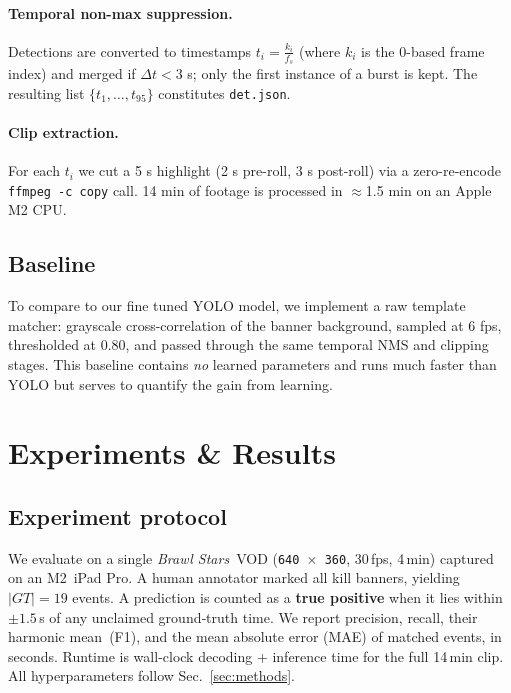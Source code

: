 \documentclass[10pt,twocolumn,letterpaper]{article}
\begin{document}
\paragraph{Temporal non-max suppression.}
Detections are converted to timestamps
\(t_i = \frac{k_i}{f_s}\) (where \(k_i\) is the 0-based frame index) and merged if
\(\Delta t < 3\) s; only the first
instance of a burst is kept.
The resulting list \(\{t_1,\dots,t_{95}\}\) constitutes
\texttt{det.json}.

\paragraph{Clip extraction.}
For each \(t_i\) we cut a 5 s highlight
(2 s pre-roll, 3 s post-roll) via a zero-re-encode
\texttt{ffmpeg -c copy} call.
14 min of footage is processed in \(\approx\)1.5 min on an Apple M2 CPU.

\subsection{Baseline}
To compare to our fine tuned YOLO model, we implement a raw template matcher:
grayscale cross-correlation of the banner background,
sampled at 6 fps, thresholded at 0.80, and passed through the
same temporal NMS and clipping stages.
This baseline contains \emph{no} learned parameters and
runs much faster than YOLO but
serves to quantify the gain from learning.


\section{Experiments \& Results}
\label{sec:exp}

\subsection{Experiment protocol}
We evaluate on a single \emph{Brawl Stars}~VOD (\texttt{640\,$\times$\,360}, 30\,fps, 4\,min)
captured on an M2~iPad Pro\@.%
A human annotator marked all kill banners, yielding $\lvert GT\rvert=19$
events.
A prediction is counted as a \textbf{true positive} when it lies within
$\pm1.5$\,s of any unclaimed ground‐truth time.
We report precision, recall, their harmonic mean~(F1), and the
mean absolute error (MAE) of matched events, in seconds.
Runtime is wall‐clock decoding + inference time for the full 14\,min clip.
All hyperparameters follow Sec.~\ref{sec:methods}.
\end{document}
